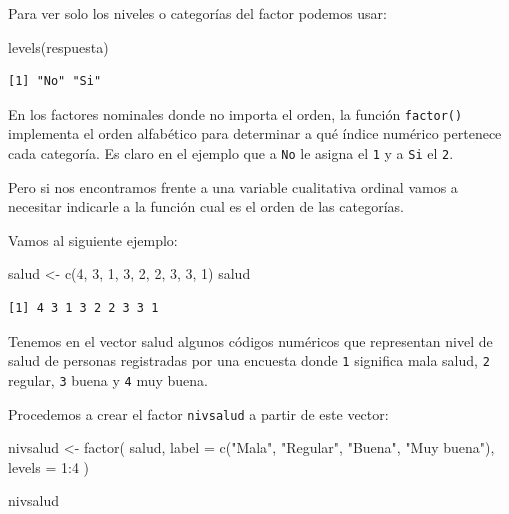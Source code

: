 \documentclass[
  spanish,
  letterpaper,
  DIV=11,
  numbers=noendperiod]{scrreprt}
\newenvironment{Shaded}{\begin{snugshade}}{\end{snugshade}}
\newcommand{\AttributeTok}[1]{\textcolor[rgb]{0.40,0.45,0.13}{#1}}
\newcommand{\DecValTok}[1]{\textcolor[rgb]{0.68,0.00,0.00}{#1}}
\newcommand{\FunctionTok}[1]{\textcolor[rgb]{0.28,0.35,0.67}{#1}}
\newcommand{\NormalTok}[1]{\textcolor[rgb]{0.00,0.23,0.31}{#1}}
\newcommand{\OtherTok}[1]{\textcolor[rgb]{0.00,0.23,0.31}{#1}}
\newcommand{\SpecialCharTok}[1]{\textcolor[rgb]{0.37,0.37,0.37}{#1}}
\newcommand{\StringTok}[1]{\textcolor[rgb]{0.13,0.47,0.30}{#1}}
\begin{document}
Para ver solo los niveles o categorías del factor podemos usar:

\begin{Shaded}
\begin{Highlighting}[]
\FunctionTok{levels}\NormalTok{(respuesta)}
\end{Highlighting}
\end{Shaded}

\begin{verbatim}
[1] "No" "Si"
\end{verbatim}

En los factores nominales donde no importa el orden, la función
\texttt{factor()} implementa el orden alfabético para determinar a qué
índice numérico pertenece cada categoría. Es claro en el ejemplo que a
\texttt{No} le asigna el \texttt{1} y a \texttt{Si} el \texttt{2}.

Pero si nos encontramos frente a una variable cualitativa ordinal vamos
a necesitar indicarle a la función cual es el orden de las categorías.

Vamos al siguiente ejemplo:

\begin{Shaded}
\begin{Highlighting}[]
\NormalTok{salud }\OtherTok{\textless{}{-}} \FunctionTok{c}\NormalTok{(}\DecValTok{4}\NormalTok{, }\DecValTok{3}\NormalTok{, }\DecValTok{1}\NormalTok{, }\DecValTok{3}\NormalTok{, }\DecValTok{2}\NormalTok{, }\DecValTok{2}\NormalTok{, }\DecValTok{3}\NormalTok{, }\DecValTok{3}\NormalTok{, }\DecValTok{1}\NormalTok{)}
\NormalTok{salud}
\end{Highlighting}
\end{Shaded}

\begin{verbatim}
[1] 4 3 1 3 2 2 3 3 1
\end{verbatim}

Tenemos en el vector salud algunos códigos numéricos que representan
nivel de salud de personas registradas por una encuesta donde \texttt{1}
significa mala salud, \texttt{2} regular, \texttt{3} buena y \texttt{4}
muy buena.

Procedemos a crear el factor \texttt{nivsalud} a partir de este vector:

\begin{Shaded}
\begin{Highlighting}[]
\NormalTok{nivsalud }\OtherTok{\textless{}{-}} \FunctionTok{factor}\NormalTok{(}
\NormalTok{  salud,}
  \AttributeTok{label =} \FunctionTok{c}\NormalTok{(}\StringTok{"Mala"}\NormalTok{, }\StringTok{"Regular"}\NormalTok{, }\StringTok{"Buena"}\NormalTok{, }\StringTok{"Muy buena"}\NormalTok{),}
  \AttributeTok{levels =} \DecValTok{1}\SpecialCharTok{:}\DecValTok{4}
\NormalTok{)}

\NormalTok{nivsalud}
\end{Highlighting}
\end{Shaded}
\end{document}
